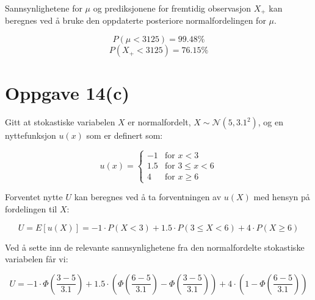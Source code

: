 \documentclass[12pt]{article}
\begin{document}
Sannsynlighetene for \(\mu\) og prediksjonene for fremtidig observasjon \(X_{+}\) kan beregnes ved å bruke den oppdaterte posteriore normalfordelingen for \(\mu\).

\[P(\mu < 3125) = 99.48\%\]
\[P(X_{+} < 3125) = 76.15\%\]

  
  
  
  


\section*{Oppgave 14(c)}

Gitt at stokastiske variabelen \( X \) er normalfordelt, \( X \sim \mathcal{N}(5,3.1^2) \), og en nyttefunksjon \( u(x) \) som er definert som:

\[ u(x) = \begin{cases} 
-1 & \text{for } x < 3 \\
1.5 & \text{for } 3 \leq x < 6 \\
4 & \text{for } x \geq 6 
\end{cases} \]

Forventet nytte \( U \) kan beregnes ved å ta forventningen av \( u(X) \) med hensyn på fordelingen til \( X \):

\[ U = E[u(X)] = -1 \cdot P(X < 3) + 1.5 \cdot P(3 \leq X < 6) + 4 \cdot P(X \geq 6) \]

Ved å sette inn de relevante sannsynlighetene fra den normalfordelte stokastiske variabelen får vi:

\[ U = -1 \cdot \Phi\left(\frac{3-5}{3.1}\right) + 1.5 \cdot \left(\Phi\left(\frac{6-5}{3.1}\right) - \Phi\left(\frac{3-5}{3.1}\right)\right) + 4 \cdot \left(1 - \Phi\left(\frac{6-5}{3.1}\right)\right) \]
\end{document}
